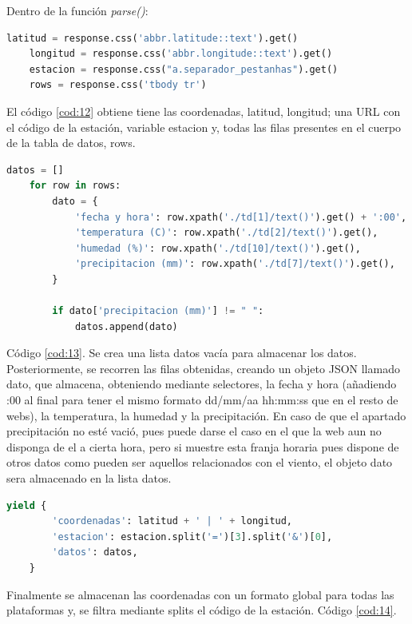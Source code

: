 Dentro de la función \textit{parse()}:

\begin{lstlisting}[language=Python, caption={Selector en \textit{parse()} de Aemet Data Spider}, label=cod:12]
	latitud = response.css('abbr.latitude::text').get()
	longitud = response.css('abbr.longitude::text').get()
	estacion = response.css("a.separador_pestanhas").get()
	rows = response.css('tbody tr')
\end{lstlisting}

El código \ref{cod:12} obtiene tiene las coordenadas, latitud, longitud; una URL con el código de la estación, variable estacion y, todas las filas presentes en el cuerpo de la tabla de datos, rows.

\begin{lstlisting}[language=Python, caption={Trabajar sobre los datos de Aemet Data Spider}, label=cod:13]
	datos = []
	for row in rows:
		dato = {
			'fecha y hora': row.xpath('./td[1]/text()').get() + ':00',
			'temperatura (C)': row.xpath('./td[2]/text()').get(),
			'humedad (%)': row.xpath('./td[10]/text()').get(),
			'precipitacion (mm)': row.xpath('./td[7]/text()').get(),
		}
		
		if dato['precipitacion (mm)'] != " ":
			datos.append(dato)
\end{lstlisting}

Código \ref{cod:13}. Se crea una lista datos vacía para almacenar los datos. Posteriormente, se recorren las filas obtenidas, creando un objeto JSON llamado dato, que almacena, obteniendo mediante selectores, la fecha y hora (añadiendo :00 al final para tener el mismo formato dd/mm/aa hh:mm:ss que en el resto de webs), la temperatura, la humedad y la precipitación.\newline
\newline
En caso de que el apartado precipitación no esté vació, pues puede darse el caso en el que la web aun no disponga de el a cierta hora, pero si muestre esta franja horaria pues dispone de otros datos como pueden ser aquellos relacionados con el viento, el objeto dato sera almacenado en la lista datos.

\begin{lstlisting}[language=Python, caption={Guardado de datos de Aemet Data Spider}, label=cod:14]
	yield {
		'coordenadas': latitud + ' | ' + longitud,
		'estacion': estacion.split('=')[3].split('&')[0],
		'datos': datos,
	}
\end{lstlisting}

Finalmente se almacenan las coordenadas con un formato global para todas las plataformas y, se filtra mediante splits el código de la estación. Código \ref{cod:14}.

